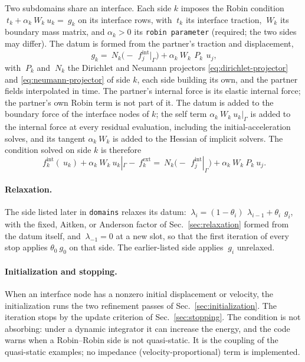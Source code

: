 \documentclass[11pt]{article}
\newcommand{\code}[1]{\texttt{#1}}
\begin{document}
Two subdomains share an interface. Each side $k$ imposes the Robin
condition $~t_k + \alpha_k ~W_k ~u_k = ~g_k$ on its interface rows, with
$~t_k$ its interface traction, $~W_k$ its boundary mass matrix, and
$\alpha_k > 0$ its \code{robin parameter} (required; the two sides may
differ). The datum is formed from the partner's traction and displacement,
\begin{equation}
  ~g_k = ~N_k \bigl( -\,~f^{\mathrm{int}}_j|_\Gamma \bigr)
       + \alpha_k ~W_k\, ~P_k\, ~u_j ,
  \label{eq:robin-datum}
\end{equation}
with $~P_k$ and $~N_k$ the Dirichlet and Neumann projectors
\eqref{eq:dirichlet-projector} and \eqref{eq:neumann-projector} of side
$k$, each side building its own, and the partner fields interpolated in
time. The partner's internal force is its elastic internal force; the
partner's own Robin term is not part of it. The datum is added to the
boundary force of the interface nodes of $k$; the self term
$\alpha_k ~W_k ~u_k|_\Gamma$ is added to the internal force at every
residual evaluation, including the initial-acceleration solves, and its
tangent $\alpha_k ~W_k$ is added to the Hessian of implicit solvers. The
condition solved on side $k$ is therefore
\begin{equation}
  ~f^{\mathrm{int}}_k(~u_k) + \alpha_k ~W_k ~u_k|_\Gamma - ~f^{\mathrm{ext}}_k
  = ~N_k \bigl( -\,~f^{\mathrm{int}}_j|_\Gamma \bigr) + \alpha_k ~W_k ~P_k ~u_j .
  \label{eq:robin-condition}
\end{equation}

\paragraph{Relaxation.} The side listed later in \code{domains} relaxes
its datum: $~\lambda_i = (1 - \theta_i)\, ~\lambda_{i-1} + \theta_i\, ~g_i$,
with the fixed, Aitken, or Anderson factor of Sec.~\ref{sec:relaxation}
formed from the datum itself, and $~\lambda_{-1} = 0$ at a new slot, so
that the first iteration of every stop applies $\theta_0 ~g_0$ on that
side. The earlier-listed side applies $~g_i$ unrelaxed.

\paragraph{Initialization and stopping.} When an interface node has a
nonzero initial displacement or velocity, the initialization runs the two
refinement passes of Sec.~\ref{sec:initialization}. The iteration stops by
the update criterion of Sec.~\ref{sec:stopping}. The condition is not
absorbing: under a dynamic integrator it can increase the energy, and the code
warns when a Robin--Robin side is not quasi-static. It is the coupling of
the quasi-static examples; no impedance (velocity-proportional) term is
implemented.
\end{document}
